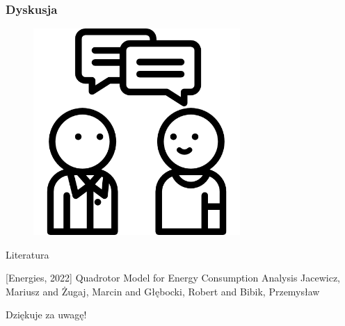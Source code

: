 \documentclass[aspectratio=169]{beamer}
\begin{document}
\begin{frame}
	\frametitle{Dyskusja}
	\begin{figure}
		\centering
		\includegraphics[width=0.7\textwidth]{questions.png}
	\end{figure}
\end{frame}

\begin{frame}{Literatura}
\begin{thebibliography}{10}
\beamertemplatebookbibitems
{}[Energies, 2022] Quadrotor Model for Energy Consumption Analysis
   \newblock  Jacewicz, Mariusz and Żugaj, Marcin and Głębocki, Robert and Bibik, Przemysław

\end{thebibliography}
\end{frame}

\begin{frame}
	  \begin{center}
	\Huge Dziękuje za uwagę!
	\end{center}
\end{frame}
\end{document}
